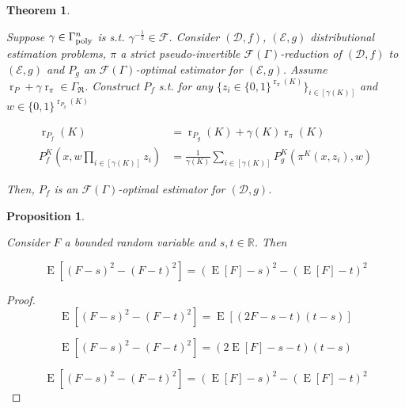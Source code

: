 \documentclass{article}
\numberwithin{equation}{section}
\theoremstyle{definition}
\theoremstyle{plain}
\newtheorem{theorem}{Theorem}[section]
\newtheorem{proposition}{Proposition}[section]
\newcommand{\Bool}{\{0,1\}}
\DeclareMathOperator{\E}{E}
\DeclareMathOperator{\R}{r}
\newcommand{\Reals}{\mathbb{R}}
\newcommand{\Dist}{\mathcal{D}}
\newcommand{\GrowR}{\Gamma_{\mathfrak{R}}}
\newcommand{\Fall}{\mathcal{F}}
\newcommand{\EG}{\Fall(\Gamma)}
\newcommand{\BoolR}[1]{\Bool^{\R_{#1}(K)}}
\newcommand{\GammaPoly}{\Gamma_{\textnormal{poly}}}
\begin{document}
\begin{samepage}
\begin{theorem}
\label{thm:sp_reduce}

Suppose $\gamma \in \GammaPoly^n$ is s.t. $\gamma^{-\frac{1}{2}} \in \Fall$. Consider $(\Dist,f)$, $(\mathcal{E},g)$ distributional estimation problems, $\pi$ a strict pseudo-invertible $\EG$-reduction of $(\Dist, f)$ to $(\mathcal{E}, g)$ and $P_g$ an $\EG$-optimal estimator for $(\mathcal{E}, g)$. Assume $\R_P + \gamma \R_\pi \in \GrowR$. Construct ${P_f}$  s.t. for any ${\{z_i \in \BoolR{\pi}\}_{i \in [\gamma(K)]}}$ and ${w \in \BoolR{P_g}}$

\begin{align}
\label{eqn:thm__sp_reduce__rpf}\R_{P_f}(K) &= \R_{P_g}(K) + \gamma(K) \R_\pi(K) \\
\label{eqn:thm__sp_reduce__pf}P_f^K(x, w \prod_{i \in [\gamma(K)]} z_i) &= \frac{1}{\gamma(K)}\sum_{i \in [\gamma(K)]} P_g^K(\pi^K(x,z_i),w)
\end{align}


Then, $P_f$ is an $\EG$-optimal estimator for ${(\Dist,g)}$.

\end{theorem}
\end{samepage}

\begin{samepage}
\begin{proposition}
\label{prp:ev_diff_sq}

Consider ${F}$ a bounded random variable and ${s,t \in \Reals}$. Then

\begin{equation}
\E[(F - s)^2 - (F - t)^2] = (\E[F] - s)^2 - (\E[F] - t)^2
\end{equation}

\end{proposition}
\end{samepage}

\begin{proof}

\[\E[(F - s)^2 - (F - t)^2] = \E[(2F - s - t)(t-s)]\]

\[\E[(F - s)^2 - (F - t)^2] = (2\E[F] - s - t)(t-s)\]

\[\E[(F - s)^2 - (F - t)^2] = (\E[F] - s)^2 - (\E[F] - t)^2\]
%
\end{proof}
\end{document}
